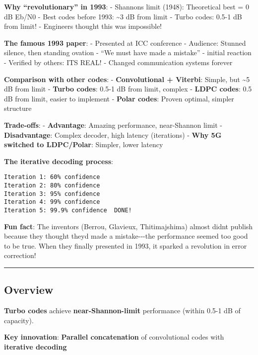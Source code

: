 \textbf{Why ``revolutionary'' in 1993}: - Shannon\textquotesingle s
limit (1948): Theoretical best = 0 dB Eb/N0 - Best codes before 1993:
\textasciitilde3 dB from limit - Turbo codes: 0.5-1 dB from limit! -
Engineers thought this was impossible!

\textbf{The famous 1993 paper}: - Presented at ICC 
conference - Audience: Stunned silence, then standing ovation - ``We
must have made a mistake'' - initial reaction - Verified by others:
IT\textquotesingle S REAL! - Changed communication systems forever

\textbf{Comparison with other codes}: - \textbf{Convolutional +
Viterbi}: Simple, but \textasciitilde5 dB from limit - \textbf{Turbo
codes}: 0.5-1 dB from limit, complex - \textbf{LDPC codes}: 0.5 dB from
limit, easier to implement - \textbf{Polar codes}: Proven optimal,
simpler structure

\textbf{Trade-offs}: - \textbf{Advantage}: Amazing performance,
near-Shannon limit - \textbf{Disadvantage}: Complex decoder, high
latency (iterations) - \textbf{Why 5G switched to LDPC/Polar}: Simpler,
lower latency

\textbf{The iterative decoding process}:

\begin{verbatim}
Iteration 1: 60% confidence
Iteration 2: 80% confidence
Iteration 3: 95% confidence  
Iteration 4: 99% confidence
Iteration 5: 99.9% confidence  DONE!
\end{verbatim}

\textbf{Fun fact}: The inventors (Berrou, Glavieux, Thitimajshima)
almost didn\textquotesingle t publish because they thought
they\textquotesingle d made a mistake-\/-\/-the performance seemed too
good to be true. When they finally presented in 1993, it sparked a
revolution in error correction!

\begin{center}\rule{0.5\linewidth}{0.5pt}\end{center}

\subsection{Overview}\label{overview}

\textbf{Turbo codes} achieve \textbf{near-Shannon-limit} performance
(within 0.5-1 dB of capacity).

\textbf{Key innovation}: \textbf{Parallel concatenation} of
convolutional codes with \textbf{iterative decoding}

